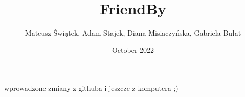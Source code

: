 \documentclass{article}
\title{FriendBy}
\author{Mateusz Świątek, Adam Stajek, Diana Misiaczyńska, Gabriela Bułat }
\date{October 2022}
\begin{document}
\maketitle

wprowadzone zmiany z githuba
i jeszcze z komputera ;)






\end{document}
